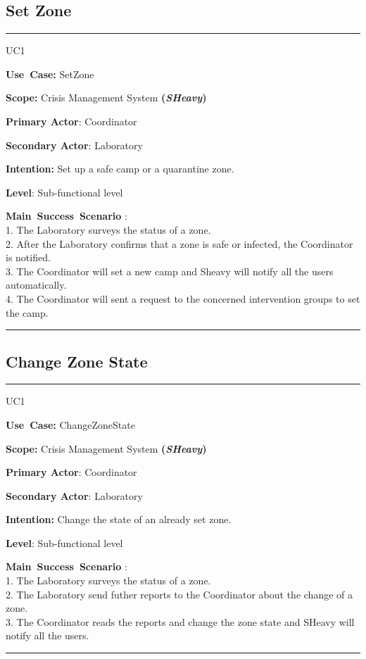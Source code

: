 \subsection{Set Zone}
\vspace{0.5cm}
\hrule
\vspace{0.5cm}
\begin{lyxlist}{UC1}
\small{
\item [\textbf{Use~Case:}] SetZone
\item [\textbf{Scope:}] Crisis Management System \textbf{(\emph{SHeavy})}
\item [\textbf{Primary Actor}:] Coordinator
\item [\textbf{Secondary Actor}:] Laboratory
\item [\textbf{Intention:}] Set up a safe camp or a quarantine zone.
\item [\textbf{Level}:]Sub-functional level
\item [\textbf{Main~Success~Scenario}]:\\
1. The Laboratory surveys the status of a zone.\\
2. After the Laboratory confirms that a zone is safe or infected, the
Coordinator is notified.\\
3. The Coordinator will set a new camp and Sheavy will notify all the users
automatically.\\ 
4.	The Coordinator will sent a request to the concerned intervention groups to
set the camp.\\
}
\end{lyxlist}
\hrule
\vspace{0.5cm} 

\subsection{Change Zone State}
\vspace{0.5cm}
\hrule
\vspace{0.5cm}
\begin{lyxlist}{UC1}
\small{
\item [\textbf{Use~Case:}] ChangeZoneState
\item [\textbf{Scope:}] Crisis Management System \textbf{(\emph{SHeavy})}
\item [\textbf{Primary Actor}:] Coordinator
\item [\textbf{Secondary Actor}:] Laboratory
\item [\textbf{Intention:}] Change the state of an already set zone.
\item [\textbf{Level}:]Sub-functional level
\item [\textbf{Main~Success~Scenario}]:\\
1. The Laboratory surveys the status of a zone.\\
2. The Laboratory send futher reports to the Coordinator about the change of a
zone.\\
3. The Coordinator reads the reports and change the zone state and SHeavy will
notify all the users.\\
}
\end{lyxlist}
\hrule
\vspace{0.5cm} 
 
